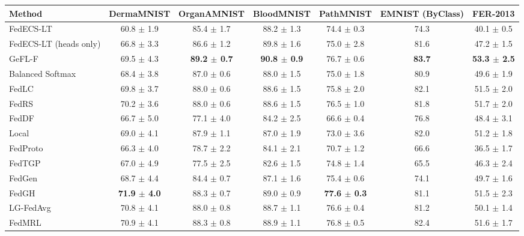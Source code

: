\begin{tabular}{lcccccc}
\toprule
Method & DermaMNIST & OrganAMNIST & BloodMNIST & PathMNIST & EMNIST (ByClass) & FER-2013\\
\midrule
FedECS-LT & 60.8 $\pm$ 1.9 & 85.4 $\pm$ 1.7 & 88.2 $\pm$ 1.3 & 74.4 $\pm$ 0.3 & 74.3 & 40.1 $\pm$ 0.5\\
FedECS-LT (heads only) & 66.8 $\pm$ 3.3 & 86.6 $\pm$ 1.2 & 89.8 $\pm$ 1.6 & 75.0 $\pm$ 2.8 & 81.6 & 47.2 $\pm$ 1.5\\
GeFL-F & 69.5 $\pm$ 4.3 & \textbf{89.2 $\pm$ 0.7} & \textbf{90.8 $\pm$ 0.9} & 76.7 $\pm$ 0.6 & \textbf{83.7} & \textbf{53.3 $\pm$ 2.5}\\
Balanced Softmax & 68.4 $\pm$ 3.8 & 87.0 $\pm$ 0.6 & 88.0 $\pm$ 1.5 & 75.0 $\pm$ 1.8 & 80.9 & 49.6 $\pm$ 1.9\\
FedLC & 69.8 $\pm$ 3.7 & 88.0 $\pm$ 0.6 & 88.6 $\pm$ 1.5 & 75.8 $\pm$ 2.0 & 82.1 & 51.5 $\pm$ 2.0\\
FedRS & 70.2 $\pm$ 3.6 & 88.0 $\pm$ 0.6 & 88.6 $\pm$ 1.5 & 76.5 $\pm$ 1.0 & 81.8 & 51.7 $\pm$ 2.0\\
FedDF & 66.7 $\pm$ 5.0 & 77.1 $\pm$ 4.0 & 84.2 $\pm$ 2.5 & 66.6 $\pm$ 0.4 & 76.8 & 48.4 $\pm$ 3.1\\
Local & 69.0 $\pm$ 4.1 & 87.9 $\pm$ 1.1 & 87.0 $\pm$ 1.9 & 73.0 $\pm$ 3.6 & 82.0 & 51.2 $\pm$ 1.8\\
FedProto & 66.3 $\pm$ 4.0 & 78.7 $\pm$ 2.2 & 84.1 $\pm$ 2.1 & 70.7 $\pm$ 1.2 & 66.6 & 36.5 $\pm$ 1.7\\
FedTGP & 67.0 $\pm$ 4.9 & 77.5 $\pm$ 2.5 & 82.6 $\pm$ 1.5 & 74.8 $\pm$ 1.4 & 65.5 & 46.3 $\pm$ 2.4\\
FedGen & 68.7 $\pm$ 4.4 & 84.4 $\pm$ 0.7 & 87.1 $\pm$ 1.6 & 75.4 $\pm$ 0.6 & 74.1 & 49.7 $\pm$ 1.6\\
FedGH & \textbf{71.9 $\pm$ 4.0} & 88.3 $\pm$ 0.7 & 89.0 $\pm$ 0.9 & \textbf{77.6 $\pm$ 0.3} & 81.1 & 51.5 $\pm$ 2.3\\
LG-FedAvg & 70.8 $\pm$ 4.1 & 88.0 $\pm$ 0.8 & 88.7 $\pm$ 1.1 & 76.6 $\pm$ 0.4 & 81.2 & 50.1 $\pm$ 1.4\\
FedMRL & 70.9 $\pm$ 4.1 & 88.3 $\pm$ 0.8 & 88.9 $\pm$ 1.1 & 76.8 $\pm$ 0.5 & 82.4 & 51.6 $\pm$ 1.7\\
\bottomrule
\end{tabular}
